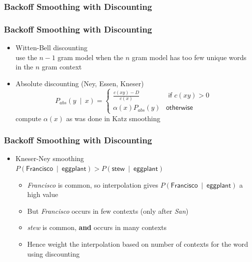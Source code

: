\subsubsection{Backoff Smoothing with Discounting}

\begin{frame}
\frametitle{Backoff Smoothing with Discounting}
\begin{itemize}[<+->]
\item Witten-Bell discounting \\
use the $n-1$ gram model when the $n$ gram model has too few unique words \alert{in the $n$ gram context}
\item Absolute discounting (Ney, Essen, Kneser)
\[ P_{\textit{abs}}(y~\mid~x) = \left\{ 
\begin{array}{cc}
\frac{ c(xy) - D }{ c(x) } & \textsf{ if $c(xy) > 0$} \\
\alpha(x) P_{\textit{abs}} (y) & \textsf{otherwise}
\end{array}
\right. \]
compute $\alpha(x)$ as was done in Katz smoothing
\end{itemize}
\end{frame}

\begin{frame}
\frametitle{Backoff Smoothing with Discounting}
\begin{itemize}[<+->]
\item Kneser-Ney smoothing \\
$P(\textsf{Francisco}~\mid~\textsf{eggplant}) > P(\textsf{stew}~\mid~\textsf{eggplant})$
\begin{itemize}[<+->]
\item {\em Francisco} is common, so interpolation gives $P(\textsf{Francisco}~\mid~\textsf{eggplant})$ a high value
\item But {\em Francisco} occurs in few contexts (only after {\em San})
\item {\em stew} is common, {\bf and} occurs in many contexts
\item Hence weight the interpolation based on number of contexts for the word using discounting
\end{itemize}
\end{itemize}
\end{frame}


